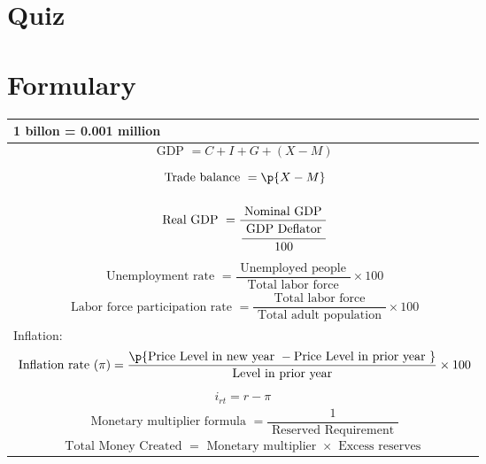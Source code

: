 \documentclass[openany]{book}
\begin{document}
\chapter{Quiz}




\chapter{Formulary}
\begin{center}
    \begin{supertabular}{ |p{16cm}| }
         billon = 0.001 million \\ 
        \hline
            \[
                \text{ GDP } = C + I + G + (X-M)
            \] \\
        \hline
            \[
                \text{ Trade balance } = \p{X - M} 
            \] \\
        \hline
            \[
                \text{ Real GDP } = \frac{\text{ Nominal GDP }}{\cfrac{\text{ GDP Deflator }}{100}} 
            \] \\
        \hline
            \[
                \text{ Unemployment rate } = \frac{\text{ Unemployed people }}{\text{ Total labor force }} \times 100 
            \] \\
        \hline
            \[
                \text{ Labor force participation rate } = \frac{\text{ Total labor force }}{\text{ Total adult population }} \times 100
            \] \\
        \hline
        Inflation: 
            \[
                \text{ Inflation rate }(\pi) = \frac{\p{\text{Price Level in new year } - \text{Price Level in prior year }} }{\text{ Level in prior year }} \times 100
            \] \\
        \hline
            \[ 
                i_{rt} = r - \pi  
            \] \\ 
        \hline
        \[
            \text{ Monetary multiplier formula } = \frac{1}{\text{ Reserved Requirement }} 
        \] \\
        \hline
        \[
          \text{ Total Money Created } = \text{ Monetary multiplier } \times \text{ Excess reserves }
\]
\end{supertabular}
\end{center}
\end{document}
